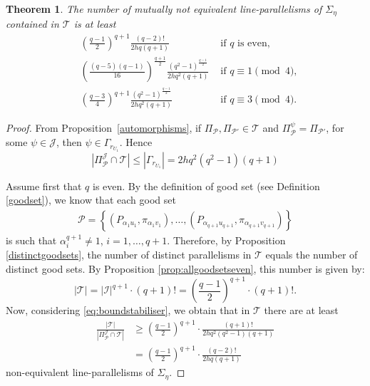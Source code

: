 \documentclass[11pt]{article}
\newtheorem{theorem}{Theorem}[section]
\theoremstyle{definition}
\numberwithin{equation}{section}
\def\cI{\mathcal I}
\def\cJ{\mathcal J}
\def\cP{\mathcal P}
\def\cT{\mathcal T}
\begin{document}
\begin{theorem}
The number of mutually not equivalent line-parallelisms of $\Sigma_{\eta}$ contained in $\cT$ is at least
    \begin{align*}
      & \left(\frac{q-1}{2}\right)^{q+1} \frac{(q-2)!}{2hq(q+1)} & \mbox{ if } q \mbox{ is even, } \\
      & \left(\frac{(q-5)(q-1)}{16}\right)^{\frac{q+1}{2}} \frac{(q^2-1)^{\frac{q-1}{2}}}{2hq^2(q+1)} & \mbox{ if }q \equiv 1 \pmod{4}, \\ 
      &  \left(\frac{q-3}{4}\right)^{q+1} \frac{(q^2-1)^{\frac{q-1}{2}}}{2hq^2(q+1)} & \mbox{ if } q \equiv 3 \pmod{4}.  
    \end{align*}
\end{theorem}
\begin{proof}
From Proposition~\ref{automorphisms}, if $\Pi_{\cP}, \Pi_{\cP'} \in \cT$ and $\Pi_{\cP}^\psi = \Pi_{\cP'}$, for some $\psi \in \cJ$, then $\psi \in \Gamma_{r_{U_1}}$. Hence
\begin{equation} \label{eq:boundstabiliser}
|\Pi_{\cP}^{\cJ} \cap \cT| \le |\Gamma_{r_{U_1}}| = 2hq^2(q^2-1)(q+1)
\end{equation}

Assume first that $q$ is even. By the definition of good set (see Definition \ref{goodset}), we know that each good set
\begin{align*}
\cP = \left\{\left(P_{\alpha_{1} u_1}, \pi_{\alpha_{1} v_1}\right), \dots, \left(P_{\alpha_{q+1} u_{q+1}}, \pi_{\alpha_{q+1} v_{q+1}}\right)\right\}
\end{align*}
is such that $\alpha_i^{q+1} \neq 1$, $i = 1, \dots, q+1$. Therefore, by Proposition \ref{distinctgoodsets}, the number of distinct parallelisms in $\cT$ equals the number of distinct good sets. By Proposition \ref{prop:allgoodsetseven}, this number is given by:
\[
|\cT| = |\cI|^{q+1} \cdot (q+1)! = \left( \frac{q-1}{2} \right)^{q+1} \cdot (q+1)!.
\]
Now, considering \eqref{eq:boundstabiliser}, we obtain that in $\cT$ there are at least
\[
\begin{array}{rl}
\displaystyle \frac{|\cT|}{|\Pi_{\cP}^{\cJ} \cap \cT|} &\displaystyle \ge \left( \frac{q-1}{2} \right)^{q+1} \cdot \frac{(q+1)!}{2hq^2(q^2 - 1)(q+1)} \\[10pt]
&\displaystyle = \left( \frac{q-1}{2} \right)^{q+1} \cdot \frac{(q-2)!}{2hq(q + 1)}
\end{array}
\]
non-equivalent line-parallelisms of $\Sigma_{\eta}$.



\end{proof}
\end{document}
